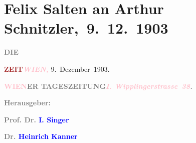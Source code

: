 

\renewcommand{\erwaehntePersonen}{Personen: Heinrich Kanner, Paul Schlenther, Isidor Singer}
\renewcommand{\erwaehnteInstitutionen}{Institutionen: Die Zeit}
\renewcommand{\erwaehnteOrte}{Orte: Wien, Wipplingerstraße}
\renewcommand{\erwaehnteWerke}{Werke: Der Schleier der Beatrice. Schauspiel in fünf Akten, Die Zeit, Erklärung [Schleier der Beatrice]}
\section[ Felix Salten an Arthur Schnitzler, 9. 12. 1903]{Felix Salten an Arthur Schnitzler, 9. 12. 1903}
\nopagebreak{}
\rehead{ }\normalsize\beginnumbering{}
\toendnotes[C]{\smallbreak\pagebreak[2]}
\toendnotes[C]{\smallbreak}
\pstart
           \noindent{}{\pb}\textcolor{gray}{\textbf{DIE}}\pend
           
\pstart
           \textcolor{gray}{\textbf{\textcolor{brown}{ZEIT}{}\ledrightnote{\textcolor{brown}{Die Zeit}}}}\hfill \textcolor{gray}{\textbf{\emph{\textcolor{pink}{WIEN,}{}\ledrightnote{\textcolor{pink}{Wien}}}}}{ }9. Dezember 1903.\pend
           
\pstart
           \textcolor{gray}{\textbf{\textcolor{pink}{WIEN}{}\ledrightnote{\textcolor{pink}{Wien}}ER TAGESZEITUNG}}\hfill \textcolor{gray}{\textbf{\emph{\textcolor{pink}{I. Wipplingerstrasse 38}{}\ledrightnote{\textcolor{pink}{Wipplingerstraße}}.}}}\pend
           
\pstart
           \textcolor{gray}{\textbf{Herausgeber:}}\pend
           
\pstart
           \textcolor{gray}{\textbf{Prof. Dr. \textcolor{blue}{I. Singer}{}\ledrightnote{\textcolor{blue}{Isidor Singer}}}}\pend
           
\pstart
           \textcolor{gray}{\textbf{Dr. \textcolor{blue}{Heinrich Kanner}{}\ledrightnote{\textcolor{blue}{Heinrich Kanner}}}}\pend
           
